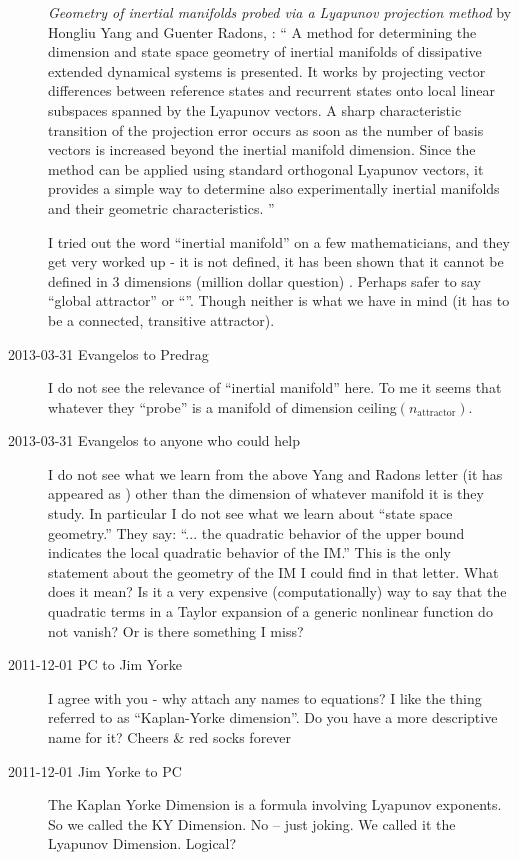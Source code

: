 \begin{description}
\emph{Geometry of inertial manifolds probed via a Lyapunov projection method}
by Hongliu Yang and Guenter Radons, :
``
A method for determining the dimension and state space geometry of
inertial manifolds of dissipative extended dynamical systems is
presented. It works by projecting vector differences between reference
states and recurrent states onto local linear subspaces spanned by the
Lyapunov vectors. A sharp characteristic transition of the projection
error occurs as soon as the number of basis vectors is increased beyond
the inertial manifold dimension. Since the method can be applied using
standard orthogonal Lyapunov vectors, it provides a simple way to
determine also experimentally inertial manifolds and their geometric
characteristics.
''

I tried out the word ``inertial manifold'' on a few mathematicians, and
they get very worked up - it is not defined, it has been shown that it
cannot be defined in 3 dimensions (million dollar question) \etc. Perhaps
safer to say ``global attractor'' or ``{\nws}''. Though neither is what
we have in mind (it has to be a connected, transitive attractor).

\item[2013-03-31 Evangelos to Predrag] I do not see the relevance of
``inertial manifold'' here. To me it seems that whatever they ``probe'' is
a manifold of dimension ceiling$(n_{\mathrm{attractor}})$.

\item[2013-03-31 Evangelos to anyone who could help]
I do not see what we learn from the above Yang and Radons
letter (it has appeared as ) other than the dimension of whatever
manifold it is they study. In particular I do not see what we learn about ``state space
geometry.'' They say: ``... the quadratic behavior of the upper bound
indicates the local quadratic behavior of the IM.'' This is the only statement
about the geometry of the IM I could find in that letter. What does it mean?
Is it a very expensive (computationally) way to say
that the quadratic terms in a Taylor expansion of a generic nonlinear function
do not vanish? Or is there something I miss?

\item[2011-12-01 PC to Jim Yorke] I agree with you - why attach any names
to equations? I like the thing referred to as ``Kaplan-Yorke dimension''.
Do you have a more descriptive name for it?
Cheers \& red socks forever

\item[2011-12-01 Jim Yorke to PC] The Kaplan Yorke Dimension is a formula
involving Lyapunov exponents. So we called the KY Dimension. No -- just
joking. We called it the Lyapunov Dimension. Logical?


\end{description}
